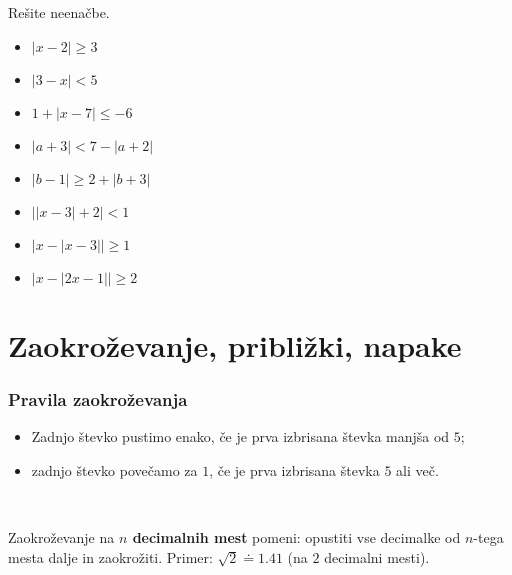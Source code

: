     
        \begin{naloga}
            Rešite neenačbe.
            \begin{itemize}
                    \item $\left\lvert x-2 \right\rvert \geq 3$ 
                    \item $\left\lvert 3-x\right\rvert <5$ 
                    \item $1+ \left\lvert x-7 \right\rvert \leq-6$ 
                    \item $\left\lvert a+3 \right\rvert < 7- \left\lvert a+2 \right\rvert$ 
                    \item $\left\lvert b-1 \right\rvert \geq 2 + \left\lvert b+3 \right\rvert$ 
                    \item $\left\lvert \lvert x-3\rvert +2\right\rvert <1$ 
                    \item $\left\lvert x- \lvert x-3\rvert \right\rvert \geq 1$ 
                    \item $\left\lvert x- \lvert 2x-1\rvert \right\rvert \geq 2$ 

            \end{itemize}
        \end{naloga}





    \newpage
\section{Zaokroževanje, približki, napake}

    
        \subsubsection*{Pravila zaokroževanja}
            \begin{itemize}
                \item Zadnjo števko pustimo enako, če je prva izbrisana števka manjša od $5$;
                \item zadnjo števko povečamo za $1$, če je prva izbrisana števka $5$ ali več.
            \end{itemize}
        

            ~~

        
            Zaokroževanje na \textbf{$n$ decimalnih mest} pomeni: 
            opustiti vse decimalke od $n$-tega mesta dalje in zaokrožiti.
            Primer: $\sqrt{2}\doteq 1.41$ (na $2$ decimalni mesti).
        
